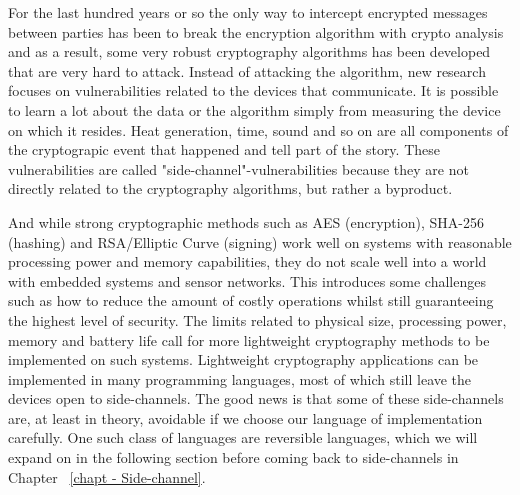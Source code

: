 
For the last hundred years or so the only way to intercept encrypted messages between parties has been to break the encryption algorithm with crypto analysis and as a result, some very robust cryptography algorithms has been developed that are very hard to attack.
Instead of attacking the algorithm, new research focuses on vulnerabilities related to the devices that communicate.
It is possible to learn a lot about the data or the algorithm simply from measuring the device on which it resides. Heat generation, time, sound and so on are all components of the cryptograpic event that happened and tell part of the story.
These vulnerabilities are called "side-channel"-vulnerabilities because they are not directly related to the cryptography algorithms, but rather a byproduct.

And while strong cryptographic methods such as AES (encryption), SHA-256 (hashing) and RSA/Elliptic Curve (signing) work well on systems with reasonable processing power and memory capabilities, they do not scale well into a world with embedded systems and sensor networks.
This introduces some challenges such as how to reduce the amount of costly operations whilst still guaranteeing the highest level of security.
The limits related to physical size, processing power, memory and battery life call for more lightweight cryptography methods to be implemented on such systems.
Lightweight cryptography applications can be implemented in many programming languages, most of which still leave the devices open to side-channels.
The good news is that some of these side-channels are, at least in theory, avoidable if we choose our language of implementation carefully.
One such class of languages are reversible languages, which we will expand on in the following section before coming back to side-channels in Chapter ~\ref{chapt - Side-channel}.


